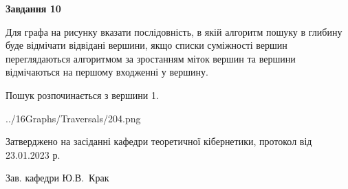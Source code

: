 \documentclass[12pt, ukrainian]{article}
\begin{document}
{\begin {large}
{\begin {center}\textbf{Завдання 10}\end {center}}\par
Для графа на рисунку вказати послідовність, в якій алгоритм пошуку в глибину буде відмічати відвідані вершини, якщо списки суміжності вершин переглядаються алгоритмом за зростанням міток вершин та вершини відмічаються на першому вход\-женні у вершину.\par
Пошук розпочинається з вершини 1.\par

\begin{center}
	{../16Graphs/Traversals/204.png}
\end{center}\par
\newpage


\end {large}
}
{\smallskip \begin {small} Затверджено на засіданні кафедри теоретичної кібернетики, протокол  від   23.01.2023 р.\par\smallskip\smallskip
{\parbox {6.5 cm}{Зав. кафедри \dotfill Ю.В.~Крак}} \end{small}}
\end{document}
